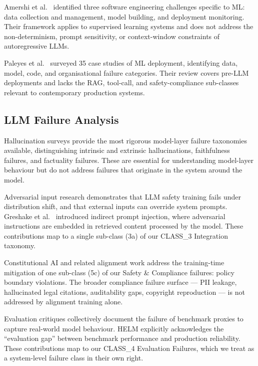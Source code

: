 \documentclass{article}
\begin{document}
Amershi et al.\ \citep{amershi2019se4ml} identified three software engineering
challenges specific to ML: data collection and management, model building, and
deployment monitoring.  Their framework applies to supervised learning systems
and does not address the non-determinism, prompt sensitivity, or context-window
constraints of autoregressive LLMs.

Paleyes et al.\ \citep{paleyes2022challenges} surveyed 35 case studies of ML
deployment, identifying data, model, code, and organisational failure categories.
Their review covers pre-LLM deployments and lacks the RAG, tool-call, and
safety-compliance sub-classes relevant to contemporary production systems.

\subsection{LLM Failure Analysis}

Hallucination surveys \citep{ji2023hallucination, huang2023survey} provide
the most rigorous model-layer failure taxonomies available, distinguishing
intrinsic and extrinsic hallucinations, faithfulness failures, and factuality
failures.  These are essential for understanding model-layer behaviour but do
not address failures that originate in the system around the model.

Adversarial input research \citep{wei2023jailbroken, perez2022injection}
demonstrates that LLM safety training fails under distribution shift, and that
external inputs can override system prompts.  Greshake et al.\
\citep{greshake2023indirect} introduced indirect prompt injection, where
adversarial instructions are embedded in retrieved content processed by the
model.  These contributions map to a single sub-class (3a) of our CLASS\_3
Integration taxonomy.

Constitutional AI \citep{bai2022constitutional} and related alignment work
address the training-time mitigation of one sub-class (5c) of our Safety \&
Compliance failures: policy boundary violations.  The broader compliance
failure surface --- PII leakage, hallucinated legal citations, auditability
gaps, copyright reproduction --- is not addressed by alignment training alone.

Evaluation critiques \citep{bowman2021nlu, liang2022helm, ribeiro2020checklist,
shankar2020evaluating} collectively document the failure of benchmark proxies
to capture real-world model behaviour.  HELM \citep{liang2022helm} explicitly
acknowledges the ``evaluation gap'' between benchmark performance and production
reliability.  These contributions map to our CLASS\_4 Evaluation Failures,
which we treat as a system-level failure class in their own right.
\end{document}

